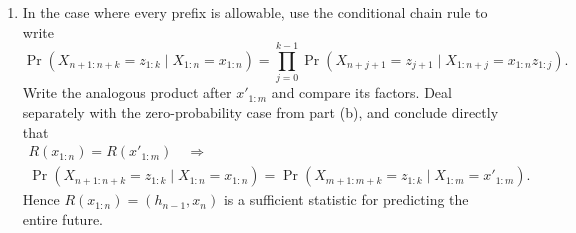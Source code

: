 \begin{exercise}
\begin{enumerate}
    \item In the case where every prefix is allowable, use the conditional
      chain rule to write
      \[
        \Pr\!\left(
          X_{n+1:n+k}=z_{1:k}\mid X_{1:n}=x_{1:n}
        \right)
        =
        \prod_{j=0}^{k-1}
        \Pr\!\left(
          X_{n+j+1}=z_{j+1}
          \mid X_{1:n+j}=x_{1:n}z_{1:j}
        \right).
      \]
      Write the analogous product after $x'_{1:m}$ and compare its factors.
      Deal separately with the zero-probability case from part (b), and
      conclude directly that
      \[
        \begin{gathered}
          R(x_{1:n})=R(x'_{1:m})
          \quad\Longrightarrow\\[1mm]
          \Pr\!\left(
            X_{n+1:n+k}=z_{1:k}\mid X_{1:n}=x_{1:n}
          \right)
          =
          \Pr\!\left(
            X_{m+1:m+k}=z_{1:k}\mid X_{1:m}=x'_{1:m}
          \right).
        \end{gathered}
      \]
      Hence $R(x_{1:n})=(h_{n-1},x_n)$ is a sufficient statistic for
      predicting the entire future.
  \end{enumerate}
\end{exercise}
